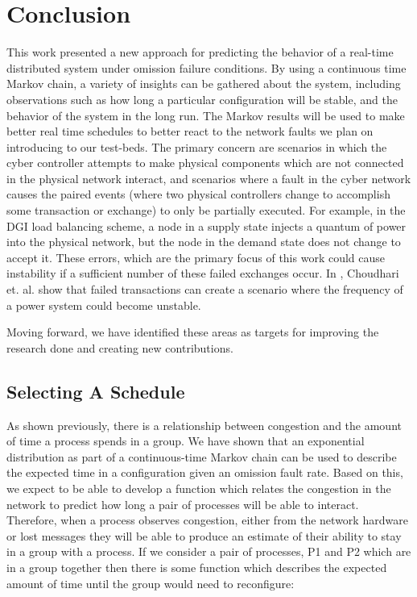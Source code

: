\chapter{Conclusion}

This work presented a new approach for predicting the behavior of a real-time distributed system under omission failure conditions.
By using a continuous time Markov chain, a variety of insights can be gathered about the system, including observations such as how long a particular configuration will be stable, and the behavior of the system in the long run. 
The Markov results will be used  to make better real time schedules to better react to the network faults we plan on introducing to our test-beds.
The primary concern are scenarios in which the cyber controller attempts to make physical components which are not connected in the physical network interact, and scenarios where a fault in the cyber network causes the paired events (where two physical controllers change to accomplish some transaction or exchange) to only be partially executed.
For example, in the DGI load balancing scheme, a node in a supply state injects a quantum of power into the physical network, but the node in the demand state does not change to accept it.
These errors, which are the primary focus of this work could cause instability if a sufficient number of these failed exchanges occur. In \cite{HARINI}, Choudhari et. al. show that failed transactions can create a scenario where the frequency of a power system could become unstable. 

Moving forward, we have identified these areas as targets for improving the research done and creating new contributions.

\section{Selecting A Schedule}

As shown previously, there is a relationship between congestion and the amount of time a process spends in a group.
We have shown that an exponential distribution as part of a continuous-time Markov chain can be used to describe the expected time in a configuration given an omission fault rate.
Based on this, we expect to be able to develop a function which relates the congestion in the network to predict how long a pair of processes will be able to interact.
Therefore, when a process observes congestion, either from the network hardware or lost messages they will be able to produce an estimate of their ability to stay in a group with a process.
If we consider a pair of processes, P1 and P2 which are in a group together then there is some function which describes the expected amount of time until the group would need to reconfigure:

